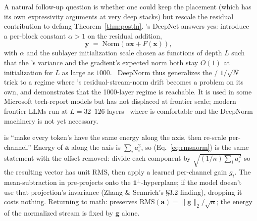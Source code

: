 A natural follow-up question is whether one could keep the 
placement (which has its own expressivity arguments at very deep stacks)
but rescale the residual contribution to defang
Theorem~\ref{thm:postln}. \citet{wang2022-deepnorm}'s DeepNet answers
yes: introduce a per-block constant $\alpha > 1$ on the residual
addition,
\begin{equation}
  \mathbf{y} \;=\; \mathrm{Norm}(\alpha \mathbf{x} + F(\mathbf{x})),
  \label{eq:deepnorm}
\end{equation}
with $\alpha$ and the sublayer initialization scale chosen as functions
of depth $L$ such that the 's variance and the
gradient's expected norm both stay $O(1)$ at initialization for $L$ as
large as $1000$.~ DeepNorm thus generalizes the  /
$1/\sqrt{N}$ trick to a regime where 's residual-stream-norm
drift becomes a problem on its own, and demonstrates that the
1000-layer regime is reachable. It is used in some Microsoft tech-report
models but has not displaced  at frontier scale; modern frontier
LLMs run at $L = 32\text{--}126$ layers~\citep{deepseek-v3,meta-llama3}
where  is comfortable and the DeepNorm machinery is not yet
necessary.

\begin{intuition}
 is ``make every token's  have the same energy
along the  axis, then re-scale per-channel.'' Energy of
$\mathbf{a}$ along the  axis is $\sum_i a_i^2$, so 
(Eq.~\eqref{eq:rmsnorm}) is the same statement with the offset removed:
divide each component by $\sqrt{(1/n) \sum_i a_i^2}$ so the resulting
vector has unit RMS, then apply a learned per-channel gain $g_i$. The
mean-subtraction in  pre-projects onto the
$\mathbf{1}^\perp$-hyperplane; if the model doesn't use that
projection's invariance (Zhang \& Sennrich's \S 3.2 finding), dropping
it costs nothing. Returning to math:  preserves
$\mathrm{RMS}(\bar{\mathbf{a}}) = \|\mathbf{g}\|_2 / \sqrt{n}$; the
energy of the normalized stream is fixed by $\mathbf{g}$ alone.
\end{intuition}

